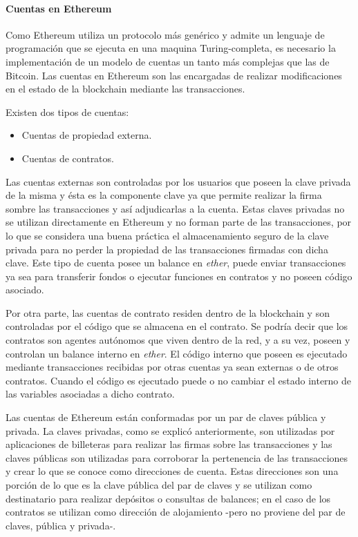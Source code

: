 \paragraph{Cuentas en Ethereum}

Como Ethereum utiliza un protocolo más genérico y admite un lenguaje de programación que se ejecuta en una maquina Turing-completa, es necesario la implementación de un modelo de cuentas un tanto más complejas que las de Bitcoin. Las cuentas en Ethereum son las encargadas de realizar modificaciones en el estado de la blockchain mediante las transacciones.

Existen dos tipos de cuentas:

\begin{itemize}
  \item Cuentas de propiedad externa.
  \item Cuentas de contratos.
\end{itemize}

Las cuentas externas son controladas por los usuarios que poseen la clave privada de la misma y ésta es la componente clave ya que permite realizar la firma sombre las transacciones y así adjudicarlas a la cuenta. Estas claves privadas no se utilizan directamente en Ethereum y no forman parte de las transacciones, por lo que se considera una buena práctica el almacenamiento seguro de la clave privada para no perder la propiedad de las transacciones firmadas con dicha clave. Este tipo de cuenta posee un balance en \textit{ether}, puede enviar transacciones ya sea para transferir fondos o ejecutar funciones en contratos y no poseen código asociado.

Por otra parte, las cuentas de contrato residen dentro de la blockchain y son controladas por el código que se almacena en el contrato. Se podría decir que los contratos son agentes autónomos que viven dentro de la red, y a su vez, poseen y controlan un balance interno en \textit{ether}. El código interno que poseen es ejecutado mediante transacciones recibidas por otras cuentas ya sean externas o de otros contratos. Cuando el código es ejecutado puede o no cambiar el estado interno de las variables asociadas a dicho contrato.

Las cuentas de Ethereum están conformadas por un par de claves pública y privada. La claves privadas, como se explicó anteriormente, son utilizadas por aplicaciones de billeteras para realizar las firmas sobre las transacciones y las claves públicas son utilizadas para corroborar la pertenencia de las transacciones y crear lo que se conoce como direcciones de cuenta. Estas direcciones son una porción de lo que es la clave pública del par de claves y se utilizan como destinatario para realizar depósitos o consultas de balances; en el caso de los contratos se utilizan como dirección de alojamiento -pero no proviene del par de claves, pública y privada-.

